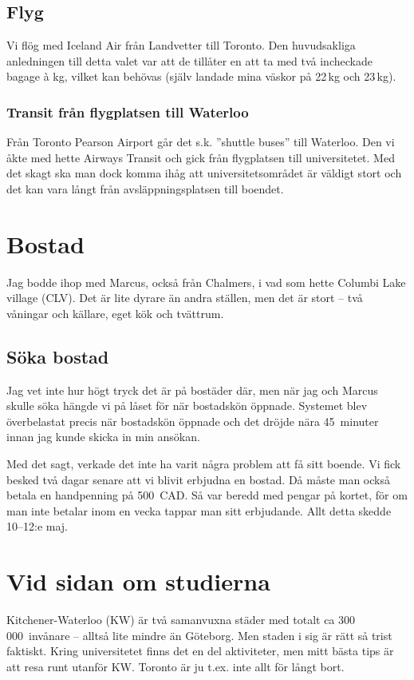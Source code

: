 \documentclass[11pt,a4paper, english, swedish]{article}
\begin{document}
\subsection{Flyg}
Vi flög med Iceland Air från Landvetter till Toronto. Den huvudsakliga
anledningen till detta valet var att de tillåter en att ta med två
incheckade bagage à \unit[23]{kg}, vilket kan behövas (själv landade
mina väskor på 22\,kg och 23\,kg).

\subsubsection{Transit från flygplatsen till Waterloo}
Från Toronto Pearson Airport går det s.k. ''shuttle buses'' till
Waterloo. Den vi åkte med hette Airways Transit och gick från
flygplatsen till universitetet. Med det skagt ska man dock komma ihåg
att universitetsområdet är väldigt stort och det kan vara långt från
avsläppningsplatsen till boendet. 







\section{Bostad}
Jag bodde ihop med Marcus, också från Chalmers, i vad som hette
Columbi Lake village (CLV). Det är lite dyrare än andra ställen, men
det är stort -- två våningar och källare, eget kök och tvättrum.  

\subsection{Söka bostad}
Jag vet inte hur högt tryck det är på bostäder där, men när jag och
Marcus skulle söka hängde vi på låset för när bostadskön
öppnade. Systemet blev överbelastat precis när bostadskön öppnade och
det dröjde nära 45~minuter innan jag kunde skicka in min ansökan.

Med det sagt, verkade det inte ha varit några problem att få sitt
boende. Vi fick besked två dagar senare att vi blivit erbjudna en
bostad. Då måste man också betala en 
handpenning på 500~CAD. Så var beredd
med pengar på kortet, för om man inte betalar inom en vecka tappar man
sitt erbjudande.
Allt detta skedde 10--12:e maj.




\section{Vid sidan om studierna}
Kitchener-Waterloo (KW) är två samanvuxna städer med totalt ca
300\,000~invånare -- alltså lite mindre än Göteborg. Men staden i sig
är rätt så trist faktiskt. Kring universitetet finns det en del
aktiviteter, men mitt bästa tips är att resa runt utanför KW. Toronto
är ju t.ex. inte allt för långt bort.
\end{document}
